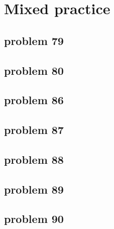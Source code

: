 \section{Mixed practice}

\subsection{problem 79}


\subsection{problem 80}


\subsection{problem 86}


\subsection{problem 87}


\subsection{problem 88}


\subsection{problem 89}


\subsection{problem 90}
